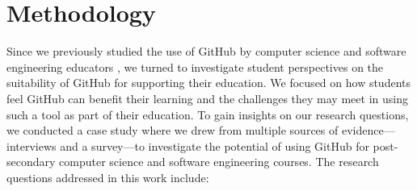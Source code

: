\section{Methodology}
Since we previously studied the use of GitHub by computer science and software engineering educators \cite{zagalsky2015emergence}, we turned to investigate student perspectives on the suitability of GitHub for supporting their education. We focused on how students feel GitHub can benefit their learning and the challenges they may meet in using such a tool as part of their education. To gain insights on our research questions, we conducted a case study \cite{yin2013case,runeson2012case} where we drew from multiple sources of evidence---interviews and a survey---to investigate the potential of using GitHub for post-secondary computer science and software engineering courses. The research questions addressed in this work include:

%

